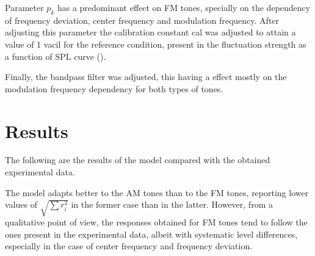 \documentclass[../main.tex]{subfiles}
\begin{document}
\begin{modelchapter}
Parameter $p_k$ has a predominant effect on \gls{FM} tones, specially on the
dependency of frequency deviation, center frequency and modulation frequency.
After adjusting this parameter the calibration constant cal was adjusted to
attain a value of 1 vacil for the reference condition, present in the
fluctuation strength as a function of \gls{SPL} curve
().

Finally, the bandpass filter was adjusted, this having a effect mostly on the
modulation frequency dependency for both types of tones.

\section{Results}

The following are the results of the model compared with the obtained
experimental data.


The model adapts better to the \gls{AM} tones than to the \gls{FM} tones,
reporting lower values of $\sqrt{\sum r_i^2}$ in the former case than in the
latter. However, from a qualitative point of view, the responses obtained for
\gls{FM} tones tend to follow the ones present in the experimental data, albeit
with systematic level differences, especially in the case of center frequency
and frequency deviation.

\end{modelchapter}
\end{document}
